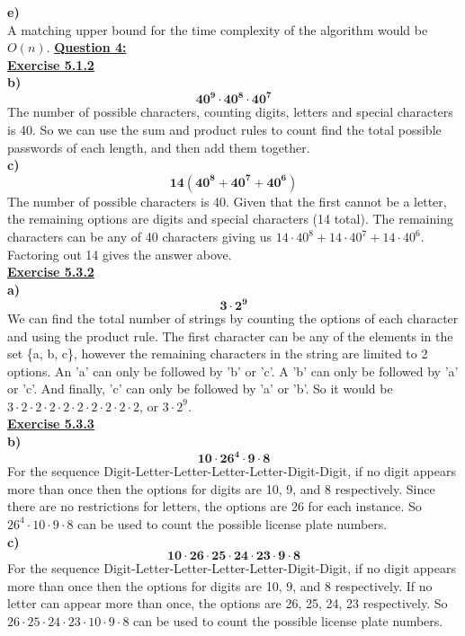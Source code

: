 \documentclass[12pt, letterpaper, twoside]{article}
\begin{document}
\break
\textbf{e)} \\
A matching upper bound for the time complexity of the algorithm would be $O(n)$.
\newpage\noindent \textbf{\underline{Question 4:}}\\
\break
\textbf{\underline{Exercise 5.1.2}}\\
\break
\textbf{b)}\[\mathbf{40^9 \cdot 40^8 \cdot 40^7}\]
\indent The number of possible characters, counting digits, letters and special characters is 40. So we can use the sum and product rules to count find the total possible passwords of each length, and then add them together.\\
\break
\textbf{c)}\[\mathbf{14(40^8 + 40^7 + 40^6)}\]
\indent The number of possible characters is 40. Given that the first cannot be a letter, the remaining options are digits and special characters (14 total). The remaining characters can be any of 40 characters giving us $14\cdot40^8 + 14\cdot40^7 + 14\cdot40^6$. Factoring out 14 gives the answer above.\\
\break
\textbf{\underline{Exercise 5.3.2}}\\
\break
\textbf{a)} \[\mathbf{3 \cdot 2^9}\]
\indent We can find the total number of strings by counting the options of each character and using the product rule. The first character can be any of the elements in the set \{a, b, c\}, however the remaining characters in the string are limited to 2 options. An 'a' can only be followed by 'b' or 'c'. A 'b' can only be followed by 'a' or 'c'. And finally, 'c' can only be followed by 'a' or 'b'. So it would be $3 \cdot 2 \cdot 2 \cdot 2 \cdot 2 \cdot 2 \cdot 2 \cdot 2 \cdot 2 \cdot 2$, or $3 \cdot 2^9$.\\
\break
\textbf{\underline{Exercise 5.3.3}}\\
\break
\textbf{b)}\[\mathbf{10 \cdot 26^4 \cdot 9 \cdot 8} \]
\indent For the sequence Digit-Letter-Letter-Letter-Letter-Digit-Digit, if no digit appears more than once then the options for digits are 10, 9, and 8 respectively. Since there are no restrictions for letters, the options are 26 for each instance. So $26^4 \cdot 10 \cdot 9 \cdot 8$ can be used to count the possible license plate numbers.\\
\break
\textbf{c)} \[\mathbf{10 \cdot 26 \cdot 25 \cdot 24 \cdot 23 \cdot 9 \cdot 8}\]
\indent For the sequence Digit-Letter-Letter-Letter-Letter-Digit-Digit, if no digit appears more than once then the options for digits are 10, 9, and 8 respectively. If no letter can appear more than once, the options are 26, 25, 24, 23 respectively. So $26 \cdot 25 \cdot 24 \cdot 23 \cdot 10 \cdot 9 \cdot 8$ can be used to count the possible license plate numbers.\\
\end{document}
